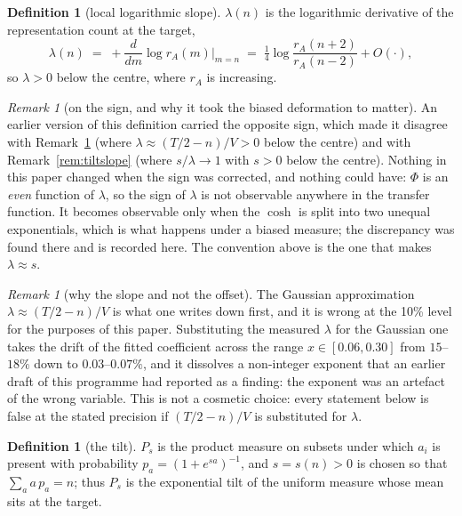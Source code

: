 \documentclass[11pt,a4paper]{article}
\theoremstyle{plain}
\theoremstyle{definition}
\newtheorem{definition}[theorem]{Definition}
\theoremstyle{remark}
\newtheorem{remark}[theorem]{Remark}
\begin{document}
\begin{definition}[local logarithmic slope]\label{def:slope}
$\lambda(n)$ is the logarithmic derivative of the representation count at the target,
\[
  \lambda(n)\;=\;+\frac{d}{dm}\log r_A(m)\Big|_{m=n}
  \;=\;\tfrac14\log\frac{r_A(n+2)}{r_A(n-2)}+O(\cdot),
\]
so $\lambda>0$ below the centre, where $r_A$ is increasing.
\end{definition}

\begin{remark}[on the sign, and why it took the biased deformation to matter]\label{rem:sign}
An earlier version of this definition carried the opposite sign, which made it disagree with
Remark~\ref{rem:whyslope} (where $\lambda\approx(T/2-n)/V>0$ below the centre) and with
Remark~\ref{rem:tiltslope} (where $s/\lambda\to1$ with $s>0$ below the centre). Nothing in
this paper changed when the sign was corrected, and nothing could have: $\Phi$ is an
\emph{even} function of $\lambda$, so the sign of $\lambda$ is not observable anywhere in the
transfer function. It becomes observable only when the $\cosh$ is split into two unequal
exponentials, which is what happens under a biased measure; the discrepancy was found there
and is recorded here. The convention above is the one that makes $\lambda\approx s$.
\end{remark}

\begin{remark}[why the slope and not the offset]\label{rem:whyslope}
The Gaussian approximation $\lambda\approx(T/2-n)/V$ is what one writes down first, and it is
wrong at the 10\% level for the purposes of this paper. Substituting the measured $\lambda$
for the Gaussian one takes the drift of the fitted coefficient across the range
$x\in[0.06,0.30]$ from $15$--$18\%$ down to $0.03$--$0.07\%$, and it dissolves a non-integer
exponent that an earlier draft of this programme had reported as a finding: the exponent was
an artefact of the wrong variable. This is not a cosmetic
choice: every statement below is false at the stated precision if $(T/2-n)/V$ is substituted
for $\lambda$.
\end{remark}

\begin{definition}[the tilt]\label{def:tilt}
$P_s$ is the product measure on subsets under which $a_i$ is present with probability
$p_{a}=(1+e^{sa})^{-1}$, and $s=s(n)>0$ is chosen so that $\sum_a a\,p_a=n$; thus $P_s$ is the
exponential tilt of the uniform measure whose mean sits at the target.
\end{definition}
\end{document}

